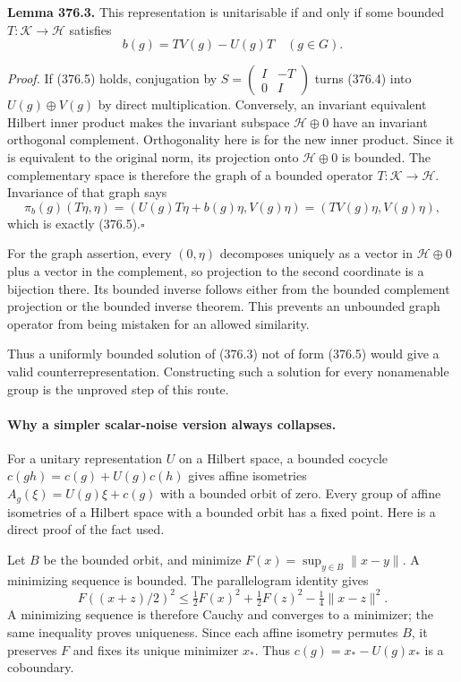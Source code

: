 \documentclass[11pt]{article}
\begin{document}
\textbf{Lemma 376.3.} This representation is unitarisable if and only
if some bounded $T:\mathcal K\to\mathcal H$ satisfies
\[
 b(g)=T V(g)-U(g)T\quad(g\in G).
 \tag{376.5}
\]

\emph{Proof.} If (376.5) holds, conjugation by
$S=\left(\begin{smallmatrix}I&-T\\0&I\end{smallmatrix}\right)$
turns (376.4) into $U(g)\oplus V(g)$ by direct multiplication.
Conversely, an invariant equivalent Hilbert inner product makes the
invariant subspace $\mathcal H\oplus0$ have an invariant orthogonal
complement. Orthogonality here is for the new inner product. Since
it is equivalent to the original norm, its projection onto
$\mathcal H\oplus0$ is bounded. The complementary space is therefore
the graph of a bounded operator $T:\mathcal K\to\mathcal H$.
Invariance of that graph says
\[
 \pi_b(g)(T\eta,\eta)=(U(g)T\eta+b(g)\eta,V(g)\eta)
                         =(TV(g)\eta,V(g)\eta),
\]
which is exactly (376.5).\hfill$\square$

For the graph assertion, every $(0,\eta)$ decomposes uniquely as a
vector in $\mathcal H\oplus0$ plus a vector in the complement, so
projection to the second coordinate is a bijection there. Its bounded
inverse follows either from the bounded complement projection or the
bounded inverse theorem. This prevents an unbounded graph operator
from being mistaken for an allowed similarity.

Thus a uniformly bounded solution of (376.3) not of form (376.5) would
give a valid counterrepresentation. Constructing such a solution for
every nonamenable group is the unproved step of this route.

\paragraph{Why a simpler scalar-noise version always collapses.}
For a unitary representation $U$ on a Hilbert space, a bounded cocycle
$c(gh)=c(g)+U(g)c(h)$ gives affine isometries
$A_g(\xi)=U(g)\xi+c(g)$ with a bounded orbit of zero. Every group of
affine isometries of a Hilbert space with a bounded orbit has a fixed
point. Here is a direct proof of the fact used.

Let $B$ be the bounded orbit, and minimize
$F(x)=\sup_{y\in B}\|x-y\|$. A minimizing sequence is bounded. The
parallelogram identity gives
\[
 F((x+z)/2)^2\le\tfrac12F(x)^2+\tfrac12F(z)^2
                         -\tfrac14\|x-z\|^2.
\]
A minimizing sequence is therefore Cauchy and converges to a minimizer;
the same inequality proves uniqueness. Since each affine isometry
permutes $B$, it preserves $F$ and fixes its unique minimizer $x_*$.
Thus $c(g)=x_*-U(g)x_*$ is a coboundary.
\end{document}
